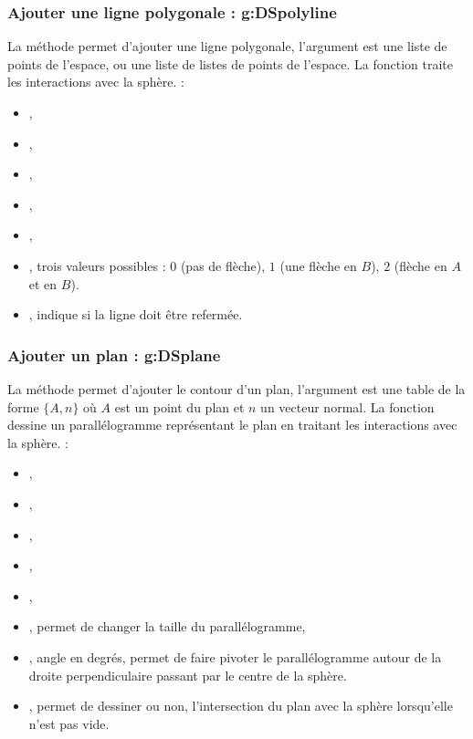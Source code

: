 \subsubsection{ Ajouter une ligne polygonale : g:DSpolyline}

La méthode  permet d'ajouter une ligne polygonale, l'argument  est une liste de points de l'espace, ou une liste de listes de points de l'espace. La fonction traite les interactions avec la sphère. \writeoptions :
    \begin{itemize}
        \item {}, 
        \item {},
        \item {},
        \item {},
        \item {},
        \item {}, trois valeurs possibles : $0$ (pas de flèche), $1$ (une flèche en $B$), $2$ (flèche en $A$ et en $B$).
        \item {}, indique si la ligne doit être refermée.
    \end{itemize}    

\subsubsection{Ajouter un plan : g:DSplane}

La méthode  permet d'ajouter le contour d'un plan, l'argument  est une table de la forme $\{A,n\}$ où $A$ est un point du plan et $n$ un vecteur normal. La fonction dessine un parallélogramme représentant le plan  en traitant les interactions avec la sphère. \writeoptions :
    \begin{itemize}
        \item {}, 
        \item {},
        \item {},
        \item {},
        \item {},
        \item {}, permet de changer la taille du parallélogramme,
        \item {}, angle en degrés, permet de faire pivoter le parallélogramme autour de la droite perpendiculaire passant par le centre de la sphère.
        \item {}, permet de dessiner ou non, l'intersection du plan avec la sphère lorsqu'elle n'est pas vide.
    \end{itemize}    

